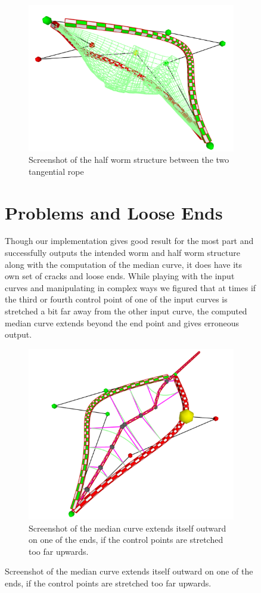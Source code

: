 \documentclass[twoside,11pt]{article}
\begin{document}
\begin{figure} [H]
\begin{figure} [H]
    \centering
    \includegraphics[width=04in]{wormHalf2.png}
    \caption{Screenshot of the half worm structure between the two tangential rope}
\end{figure}





\section{Problems and Loose Ends}

Though our implementation gives good result for the most part and successfully outputs the intended worm and half worm structure along with the computation of the median curve, it does have its own set of cracks and loose ends. While playing with the input curves and manipulating in complex ways we figured that at times if the third or fourth control point of one of the input curves is stretched a bit far away from the other input curve, the computed median curve extends beyond the end point and gives erroneous output.

\begin{figure} [H]
    \centering
    \includegraphics[width=04in]{problemCase1.png}
    \caption{Screenshot of the median curve extends itself outward on one of the ends, if the control points are stretched too far upwards.}
\end{figure}


\end{figure}
\end{document}

